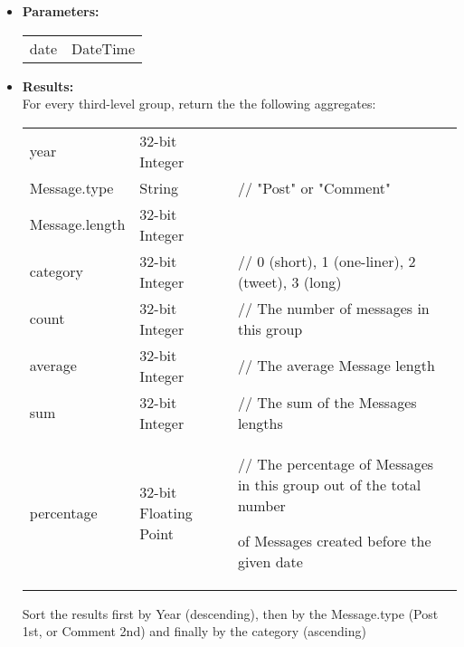 {\begin{enumerate}
\begin{itemize}
                \item \textbf{Parameters:} \\
                    \begin{tabular}{ll}
                      date 										& DateTime \\
                    \end{tabular}
                \item \textbf{Results:} \\
                  For every third-level group, return the the following aggregates:
                    \begin{tabular}{lll}
                      year 					& 32-bit Integer & \\
                      Message.type	& String & \parbox[t]{20cm}{// "Post" or "Comment"  \strut} \\
                      Message.length & 32-bit Integer & \\
                      category & 32-bit Integer & \parbox[t]{20cm}{// 0 (short), 1 (one-liner), 2 (tweet), 3 (long) \strut}  \\
                      count & 32-bit Integer &  \parbox[t]{20cm}{// The number of messages in this group  \strut} \\
                      average & 32-bit Integer &  \parbox[t]{20cm}{// The average Message length \strut} \\
                      sum & 32-bit Integer &  \parbox[t]{20cm}{// The sum of the Messages lengths \strut} \\
                      percentage & 32-bit Floating Point &  \parbox[t]{20cm}{// The percentage of Messages in this group
                        out of the total number \par of Messages created before the given date  \strut} \\
                      \end{tabular}
                    Sort the results first by Year (descending), then by the Message.type (Post 1st, or Comment 2nd) and
                    finally by the category (ascending)
                    \end{itemize}


\end{enumerate}}
